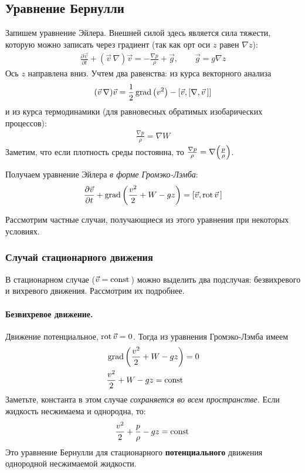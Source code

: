 \subsection{Уравнение Бернулли}
Запишем уравнение Эйлера. Внешней силой здесь является сила тяжести, которую можно записать через градиент (так как орт оси $z$ равен $\nabla z$): 
\begin{align*}
\frac { \partial \vec{v} } { \partial t } + ( \vec{v}\,\nabla ) \vec{v} = - \frac { \nabla p } { \rho } + \vec { g }, \qquad
\vec { g } = g \nabla z
\end{align*}
Ось $z$ направлена вниз. Учтем два равенства: из курса векторного анализа
\begin{equation}
	(\vec {v}\, \nabla ) \vec{v} = \frac12\operatorname{grad}\qty(v^2) - \qty[ \vec{v} , [\nabla , \vec{v}\,]]
\end{equation}
 и из курса термодинамики (для равновесных обратимых изобарических процессов):
\begin{align*}
\frac { \nabla p } { \rho } = \nabla W 
\end{align*}
Заметим, что если плотность среды постоянна, то $\frac{\nabla p}{\rho}=\nabla\qty(\frac{p}{\rho})$.

Получаем уравнение Эйлера \textit{в форме Громэко-Лэмба}:
\begin{align*}
\frac { \partial \vec{v} } { \partial t } +\operatorname{grad} \left( \frac { v ^ { 2 } } { 2 } + W - g z \right) = [ \vec{v} , \operatorname{rot} \vec{v}\,]
\end{align*}

Рассмотрим частные случаи, получающиеся из этого уравнения при некоторых условиях.

\subsubsection{Случай стационарного движения}
В стационарном случае ($\vec{v}=\mathrm{const}\,$) можно выделить два подслучая: безвихревого и вихревого движения. Рассмотрим их подробнее.

\paragraph{Безвихревое движение.}
Движение потенциальное, $\operatorname{rot} \vec{v}=0$. 		Тогда из уравнения Громэко-Лэмба имеем
\begin{align*}
&\operatorname{grad} \left( \frac { v ^ { 2 } } { 2 } + W - g z \right) = 0 \\
& \frac { v ^ { 2 } } { 2 } + W - g z = \mathrm{const}\,
\end{align*}
Заметьте, константа в этом случае \textit{сохраняется во всем пространстве.} Если жидкость несжимаема и однородна, то:
\begin{align*}
\frac { v ^ { 2 } } { 2 } + \frac { p } { \rho } - g z = \mathrm{const}\,
\end{align*}
Это уравнение Бернулли для стационарного \textbf{потенциального} движения однородной несжимаемой жидкости.

